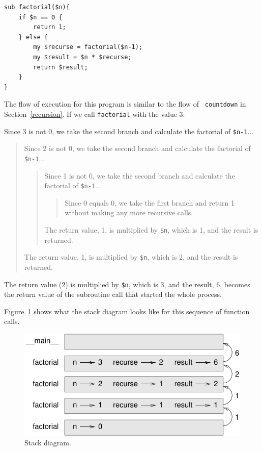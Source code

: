 \begin{verbatim}
sub factorial($n){
    if $n == 0 {
        return 1;
    } else {
        my $recurse = factorial($n-1);
        my $result = $n * $recurse;
        return $result;
    }
}
\end{verbatim}
%
The flow of execution for this program is similar to the flow of {\tt
countdown} in Section~\ref{recursion}.  If we call {\tt factorial}
with the value 3:

Since 3 is not 0, we take the second branch and calculate the factorial
of {\tt \$n-1}...

\begin{quote}
Since 2 is not 0, we take the second branch and calculate the factorial of
{\tt \$n-1}...


  \begin{quote}
  Since 1 is not 0, we take the second branch and calculate the factorial
  of {\tt \$n-1}...


    \begin{quote}
    Since 0 equals 0, we take the first branch and return 1
    without making any more recursive calls.
    \end{quote}


  The return value, 1, is multiplied by \verb'$n', which is 1, and the
  result is returned.
  \end{quote}


The return value, 1, is multiplied by \verb'$n', which is 2, and the
result is returned.
\end{quote}


The return value (2) is multiplied by \verb'$n', which is 3, and 
the result, 6, becomes the return value of the subroutine call 
that started the whole process.

Figure~\ref{fig.stack3} shows what the stack diagram looks like for
this sequence of function calls.

\begin{figure}
\centerline
{\includegraphics[scale=0.8]{figs/stack3.pdf}}
\caption{Stack diagram.}
\label{fig.stack3}
\end{figure}

